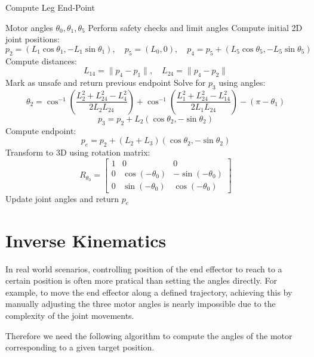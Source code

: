 \documentclass[a4paper,11pt]{article}
\begin{document}
\begin{algorithm}[H]
	\caption{Compute Leg End-Point}
	\begin{algorithmic}[1]
			\Require Motor angles $\theta_0, \theta_1, \theta_5$
			\State Perform safety checks and limit angles
			\State Compute initial 2D joint positions:
			\[
				p_2 = (L_1 \cos \theta_1, -L_1 \sin \theta_1), \quad
				p_5 = (L_0, 0), \quad
				p_4 = p_5 + (L_5 \cos \theta_5, -L_5 \sin \theta_5)
			\]
			\State Compute distances:
			\[
					L_{14} = \| p_4 - p_1 \|, \quad
					L_{24} = \| p_4 - p_2 \|
			\]
					\State Mark as unsafe and return previous endpoint
			\EndIf
			\State Solve for $p_3$ using angles:
			\[
					\theta_2 = \cos^{-1} \left( \frac{L_2^2 + L_{24}^2 - L_4^2}{2 L_2 L_{24}} \right) +
										 \cos^{-1} \left( \frac{L_1^2 + L_{24}^2 - L_{14}^2}{2 L_1 L_{24}} \right) - (\pi - \theta_1)
			\]
			\[
					p_3 = p_2 + L_2 (\cos \theta_2, -\sin \theta_2)
			\]
			\State Compute endpoint:
			\[
					p_e = p_2 + (L_2 + L_3)(\cos \theta_2, -\sin \theta_2)
			\]
			\State Transform to 3D using rotation matrix:
			\[
					R_{\theta_0} =
					\begin{bmatrix}
							1 & 0 & 0 \\
							0 & \cos(-\theta_0) & -\sin(-\theta_0) \\
							0 & \sin(-\theta_0) & \cos(-\theta_0)
					\end{bmatrix}
			\]
			\State Update joint angles and return $p_e$
	\end{algorithmic}
\end{algorithm}

\section*{Inverse Kinematics}

In real world scenarios, controlling position of the end effector to reach to a certain position
is often more pratical than setting the angles directly. For example, to move the end effector along 
a defined trajectory, achieving this by manually adjusting the three motor angles is nearly impossible 
due to the complexity of the joint movements. 

Therefore we need the following algorithm 
to compute the angles of the motor corresponding to a given target position.
\end{document}
